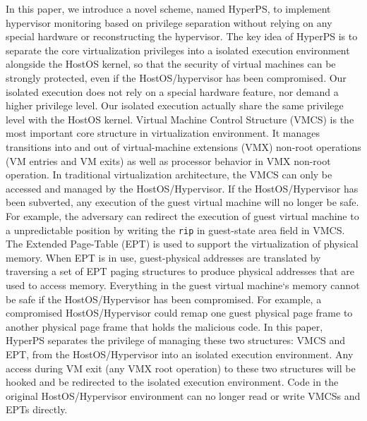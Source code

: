 \iffalse
################################
###### 关于以往方案的描述 ######
################################
但是这些功能往往提供的是一个相对封闭的运行环境，其与外界的交互是十分受限的。
对在被这些硬件包括的区域中的代码和数据的访问是十分受限的，
并不能满足将整个虚拟化环境相关特权分离的环境要求。此外，这些硬件特性需要研发者重新设计他们的软件架构甚至是逻辑。

################################
###### 关于以往方案的描述 ######
################################

\fi
In this paper, we introduce a novel scheme, named HyperPS, to implement hypervisor monitoring based on privilege separation without relying on any special hardware or reconstructing the hypervisor. The key idea of HyperPS is to separate the core virtualization privileges into a isolated execution environment alongside the HostOS kernel,
so that the security of virtual machines can be strongly protected, even if the HostOS/hypervisor has been compromised. Our isolated execution does not rely on a special hardware feature, nor demand a higher privilege level. Our isolated execution actually share the same privilege level with the HostOS kernel. 
Virtual Machine Control Structure (VMCS) is the most important core structure in virtualization environment. It manages transitions into and out of virtual-machine extensions (VMX) non-root operations (VM entries and VM exits) as well as processor behavior in VMX non-root operation. In traditional virtualization architecture, the VMCS can only be accessed and managed by the HostOS/Hypervisor.
If the HostOS/Hypervisor has been subverted, any execution of the guest virtual machine will no longer be safe. For example, the adversary can redirect the execution of guest virtual machine to a unpredictable position by writing the \verb|rip| in guest-state area field in VMCS.
The Extended Page-Table (EPT) is used to support the virtualization of physical memory. When EPT is in use, guest-physical addresses are translated by traversing a set of EPT paging structures to produce physical addresses that are used to access memory. Everything in the guest virtual machine`s memory cannot be safe if the HostOS/Hypervisor has been compromised. For example, a compromised HostOS/Hypervisor could remap one guest physical page frame to another physical page frame that holds the malicious code.
In this paper, HyperPS separates the privilege of managing these two structures: VMCS and EPT, from the HostOS/Hypervisor into an isolated execution environment. Any access during VM exit (any VMX root operation) to these two structures will be hooked and be redirected to the isolated execution environment. Code in the original HostOS/Hypervisor environment can no longer read or write VMCSs and EPTs directly. 


